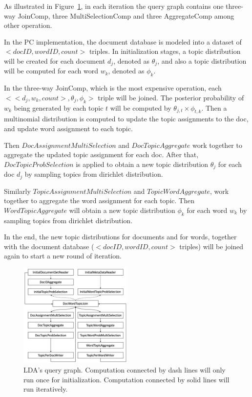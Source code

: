 As illustrated in Figure~\ref{fig:lda-query-graph}, in each iteration the query graph contains
one three-way JoinComp, three MultiSelectionComp and three
AggregateComp among other operation. 


\vspace{5pt}
In the PC implementation, the document database is modeled into a
dataset of $<docID, wordID, count>$ triples. In initialization stages, a
topic distribution will be created for each document $d_j$, denoted as
$\theta_j$, and also a topic
distribution will be computed for each word $w_k$, denoted as $\phi_k$. 

In the three-way JoinComp, which is the
most expensive operation, each $<<d_j, w_k, count>, \theta_j, \phi_k>$
triple will be joined. The posterior probability of $w_k$ being
generated by each topic $t$ will be computed by $\theta_{j,t}\times
\phi_{t,k}$. Then a multinomial distribution is computed to
update the topic assignments to the doc, and update word assignment
to each topic. 

Then $DocAssignmentMultiSelection$ and
$DocTopicAggregate$ work together to aggregate the updated topic
assignment for each doc. After that,
$DocTopicProbSelection$ is applied to obtain a new topic distribution $\theta_j$
for each doc $d_j$ by sampling topics from dirichlet distribution.

Similarly $TopicAssignmentMultiSelection$ and $TopicWordAggregate$,
work together to aggregate the word
assignment for each topic. Then $WordTopicAggregate$ will obtain a new
topic distribution $\phi_k$ for each word $w_k$ by sampling topics from
dirichlet distribution.

In the end, the new topic distributions for documents and for words,
together with the document database ($<docID, wordID, count>$ triples)
will be joined again to start a new round of iteration.




\begin{figure}
\centering
\includegraphics[width=0.5\textwidth]{lda-query-graph.pdf}
  \caption{\label{fig:lda-query-graph} LDA's query graph. Computation
    connected by dash lines will only run once for
    initialization. Computation connected by solid lines will run iteratively.}
\end{figure}


